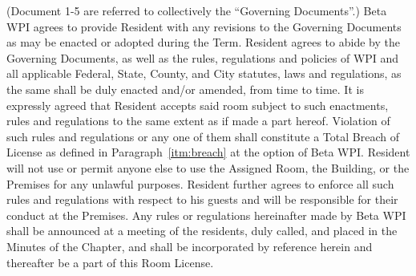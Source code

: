 \documentclass[legalpaper, 12pt]{article}
\begin{document}
\begin{enumerate}
                (Document 1-5 are referred to collectively the ``Governing
                Documents''.) Beta WPI agrees to provide Resident with any
                revisions to the Governing Documents as may be enacted or
                adopted during the Term.  Resident agrees to abide by the
                Governing Documents, as well as the rules, regulations and
                policies of WPI and all applicable Federal, State, County, and
                City statutes, laws and regulations, as the same shall be duly
                enacted and/or amended, from time to time.  It is expressly
                agreed that Resident accepts said room subject to such
                enactments, rules and regulations to the same extent as if made
                a part hereof.  Violation of such rules and regulations or any
                one of them shall constitute a Total Breach of License as
                defined in Paragraph~\ref{itm:breach} at the option of Beta
                WPI\@.  Resident will not use or permit anyone else to use the
                Assigned Room, the Building, or the Premises for any unlawful
                purposes.  Resident further agrees to enforce all such rules
                and regulations with respect to his guests and will be
                responsible for their conduct at the Premises.  Any rules or
                regulations hereinafter made by Beta WPI shall be announced at
                a meeting of the residents, duly called, and placed in the
                Minutes of the Chapter, and shall be incorporated by reference
                herein and thereafter be a part of this Room License.


\end{enumerate}
\end{document}
